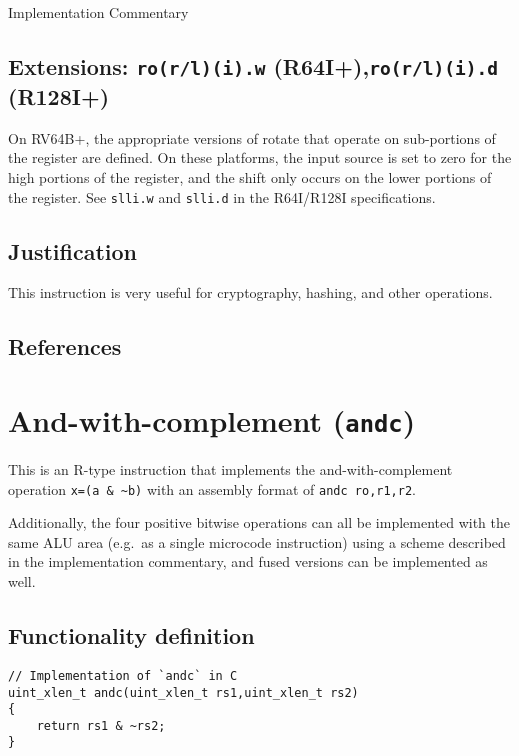 Implementation Commentary

\subsection{Extensions: \texttt{ro(r/l)(i).w} (R64I+),\texttt{ro(r/l)(i).d} (R128I+)}

On RV64B+, the appropriate versions of rotate that operate on
sub-portions of the register are defined. On these platforms, the input
source is set to zero for the high portions of the register, and the
shift only occurs on the lower portions of the register. See
\texttt{slli.w} and \texttt{slli.d} in the R64I/R128I specifications.

\subsection{Justification}

This instruction is very useful for cryptography, hashing, and other
operations.

\subsection{References}


\section{And-with-complement (\texttt{andc})}



This is an R-type instruction that implements the and-with-complement
operation \texttt{x=(a\ \&\ \textasciitilde{}b)} with an assembly format
of \texttt{andc\ ro,r1,r2}.

Additionally, the four positive bitwise operations can all be
implemented with the same ALU area (e.g.~as a single microcode
instruction) using a scheme described in the implementation commentary,
and fused versions can be implemented as well.

\subsection{Functionality definition}

\begin{verbatim}
// Implementation of `andc` in C
uint_xlen_t andc(uint_xlen_t rs1,uint_xlen_t rs2)
{
    return rs1 & ~rs2;
}
\end{verbatim}

